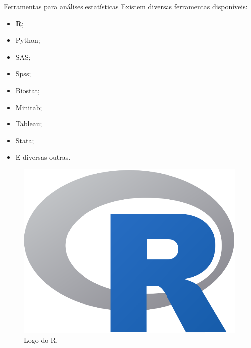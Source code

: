\documentclass[
  ignorenonframetext,
  serif,
  professionalfont,
  usenames,
  dvipsnames,
  aspectratio = 169]{beamer}
\def\beginAHalfColumn{\begin{minipage}{0.49\textwidth}}%
\def\endColumns{\end{minipage}}%
\begin{document}
\begin{frame}{Ferramentas para análises estatísticas}
\protect\hypertarget{ferramentas-para-anuxe1lises-estatuxedsticas-1}{}
Existem diversas ferramentas disponíveis:

\beginAHalfColumn

\begin{itemize}
\item
  \textbf{R};
\item
  Python;
\item
  SAS;
\item
  Spss;
\item
  Biostat;
\item
  Minitab;
\item
  Tableau;
\item
  Stata;
\item
  E diversas outras.
\end{itemize}

\endColumns
\beginAHalfColumn

\begin{figure}

{\centering \includegraphics[width=0.8\linewidth]{./img/rlogo} 

}

\caption{Logo do R.}\label{fig:unnamed-chunk-5}
\end{figure}

\endColumns
\end{frame}
\end{document}
